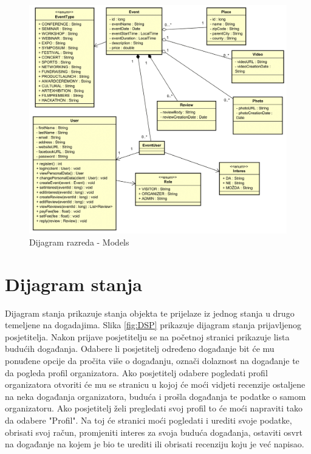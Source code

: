 			
		\begin{figure}[H]
			\includegraphics[width=\textwidth]{slike/DRM-1.PNG} %
			\caption{Dijagram razreda - Models}
			\label{fig:DRM} %
		\end{figure}
			
			
			\eject
		
		\section{Dijagram stanja}
			

			
			Dijagram stanja prikazuje stanja objekta te prijelaze iz jednog stanja u drugo temeljene na dogadajima. Slika \ref{fig:DSP} prikazuje dijagram stanja prijavljenog posjetitelja. Nakon prijave posjetitelju se na početnoj stranici prikazuje lista budućih događanja. Odabere li posjetitelj određeno događanje bit će mu ponuđene opcije da pročita više o događanju, označi dolaznost na događanje te da pogleda profil organizatora. Ako posjetitelj odabere pogledati profil organizatora otvoriti će mu se stranicu u kojoj će moći vidjeti recenzije ostaljene na neka događanja organizatora, buduća i prošla događanja te podatke o samom organizatoru. Ako posjetitelj želi pregledati svoj profil to će moći napraviti tako da odabere "Profil". Na toj će stranici moći pogledati i urediti svoje podatke, obrisati svoj račun, promjeniti interes za svoja buduća događanja, ostaviti osvrt na događanje na kojem je bio te urediti ili obrisati recenziju koju je već napisao.
			
